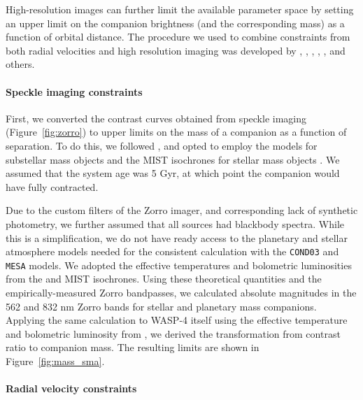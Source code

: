\documentclass[12pt,twocolumn,tighten]{aastex62}
\begin{document}
High-resolution images can further limit the available parameter space
by setting an upper limit on the companion brightness (and the
corresponding mass) as a function of orbital distance.  The procedure
we used to combine constraints from both radial velocities and high
resolution imaging was developed by \citet{wright_linear_trends_2007},
\citet{crepp_trends_2012}, \citet{montet_trends_2014},
\citet{knutson_friends_2014},
\citet{bryan_statistics_2016,bryan_excess_2019}, and others.

\paragraph{Speckle imaging constraints}

First, we converted the contrast curves obtained from speckle imaging
(Figure~\ref{fig:zorro}) to upper limits on the mass of a companion as
a function of separation. To do this, we followed
\citet{montet_trends_2014}, and opted to employ the
\citet{baraffe_evolutionary_2003} models for substellar mass objects
and the MIST isochrones for stellar mass objects
\citep{paxton_modules_2011,paxton_modules_2013,paxton_modules_2015,dotter_mesa_2016,choi_mesa_2016}.
We assumed that the system age was 5 Gyr, at which point the companion
would have fully contracted.

Due to the custom filters of the Zorro imager, and corresponding lack
of synthetic photometry, we further assumed that all sources had
blackbody spectra. While this is a simplification, we do not have
ready access to the planetary and stellar atmosphere models needed for
the consistent calculation with the \texttt{COND03} and \texttt{MESA}
models.  We adopted the effective temperatures and bolometric
luminosities from the \citet{baraffe_evolutionary_2003} and MIST
isochrones.  Using these theoretical quantities and the
empirically-measured Zorro bandpasses, we calculated absolute
magnitudes in the 562 and 832 nm Zorro bands for stellar and planetary
mass companions.  Applying the same calculation to WASP-4 itself using
the effective temperature and bolometric luminosity from
, we derived the transformation from
contrast ratio to companion mass.  The resulting limits are shown in
Figure~\ref{fig:mass_sma}.

\paragraph{Radial velocity constraints}
\end{document}
